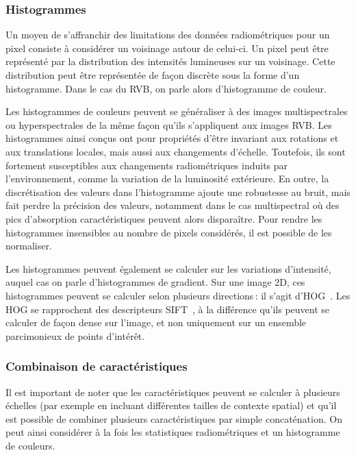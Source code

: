 \subsubsection{Histogrammes}

Un moyen de s'affranchir des limitations des données radiométriques pour un pixel consiste à considérer un voisinage autour de celui-ci. Un pixel peut être représenté par la distribution des intensités lumineuses sur un voisinage. Cette distribution peut être représentée de façon discrète sous la forme d'un histogramme. Dans le cas du \gls{RVB}, on parle alors d'histogramme de couleur.

Les histogrammes de couleurs peuvent se généraliser à des images multispectrales ou hyperspectrales de la même façon qu'ils s'appliquent aux images \gls{RVB}. Les histogrammes ainsi conçus ont pour propriétés d'être invariant aux rotations et aux translations locales, mais aussi aux changements d'échelle. Toutefois, ils sont fortement susceptibles aux changements radiométriques induits par l'environnement, comme la variation de la luminosité extérieure. En outre, la discrétisation des valeurs dans l'histogramme ajoute une robustesse au bruit, mais fait perdre la précision des valeurs, notamment dans le cas multispectral où des pics d'absorption caractéristiques peuvent alors disparaître. Pour rendre les histogrammes insensibles au nombre de pixels considérés, il est possible de les normaliser.

Les histogrammes peuvent également se calculer sur les variations d'intensité, auquel cas on parle d'histogrammes de gradient. Sur une image 2D, ces histogrammes peuvent se calculer selon plusieurs directions\,: il s'agit d'\gls{HOG}~\cite{dalal_histograms_2005}. Les \gls{HOG} se rapprochent des descripteurs \gls{SIFT}~\cite{lowe_object_1999}, à la différence qu'ils peuvent se calculer de façon dense sur l'image, et non uniquement sur un ensemble parcimonieux de points d'intérêt.

\subsubsection{Combinaison de caractéristiques}

Il est important de noter que les caractéristiques peuvent se calculer à plusieurs échelles (par exemple en incluant différentes tailles de contexte spatial) et qu'il est possible de combiner plusieurs caractéristiques par simple concaténation. On peut ainsi considérer à la fois les statistiques radiométriques et un histogramme de couleurs.

